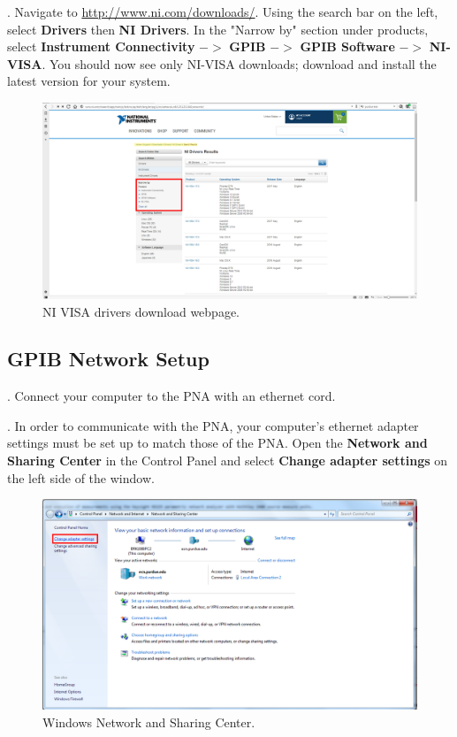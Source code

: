 \documentclass[]{article}
\begin{document}
\ex. Navigate to \url{http://www.ni.com/downloads/}. Using the search bar on the left, select \textbf{Drivers} then \textbf{NI Drivers}. In the "Narrow by" section under products, select \textbf{Instrument Connectivity} $->$ \textbf{GPIB} $->$ \textbf{GPIB Software} $->$ \textbf{NI-VISA}. You should now see only NI-VISA downloads; download and install the latest version for your system.

\begin{figure}[H]
	\centering
	\includegraphics[width=\linewidth]{Figures/nivisa}
	\caption{NI VISA drivers download webpage. }
	\label{fig:nivisa}
\end{figure}



\subsection{GPIB Network Setup}

\ex. Connect your computer to the PNA with an ethernet cord. 

\ex. In order to communicate with the PNA, your computer's ethernet adapter settings must be set up to match those of the PNA. Open the \textbf{Network and Sharing Center} in the Control Panel and select \textbf{Change adapter settings} on the left side of the window.


\begin{figure}[H]
	\centering
	\includegraphics[width=\linewidth]{Figures/cp1}
	\caption{Windows Network and Sharing Center.}
	\label{fig:cp1}
\end{figure}
\end{document}
